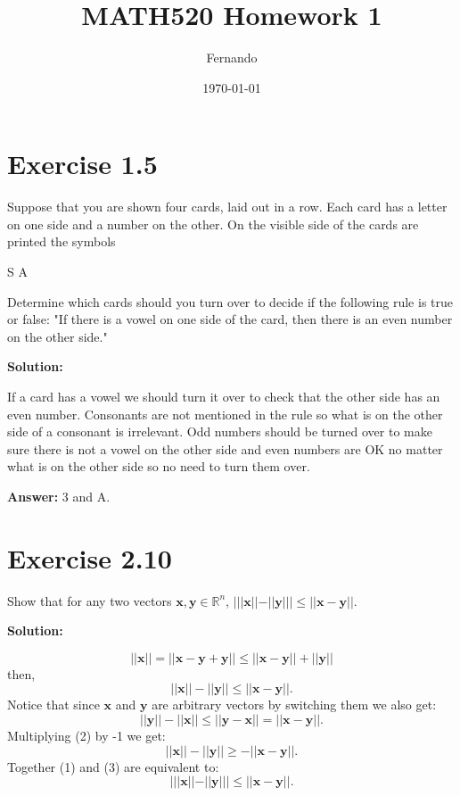 \documentclass{article}
\newcommand{\bld}[1]{\boldsymbol{#1}}
\begin{document}
\title{MATH520 Homework 1}
\author{Fernando}
\date{\today}
\maketitle

\section*{Exercise 1.5}
Suppose that you are shown four cards, laid out in a row. Each card has a letter on one side and a number on the other. On the visible side of the cards are printed the symbols

\begin{center}
S   \quad A
\end{center}

Determine which cards should you turn over to decide if the following rule is true or false: "If there is a vowel on one side of the card, then there is an even number on the other side."

\textbf{Solution:}

If a card has a vowel we should turn it over to check that the other side has
an even number. Consonants are not mentioned in the rule so what is on the
other side of a consonant is irrelevant. Odd numbers should be turned over to
make sure there is not a vowel on the other side and even numbers are OK no
matter what is on the other side so no need to turn them over.

\textbf{Answer:} 3 and A.
\section*{Exercise 2.10}
Show that for any two vectors $\boldsymbol{x},\boldsymbol{y}\in\mathbb{R}^n$,
$|||\boldsymbol{x}||-||\boldsymbol{y}||| \leq
||\boldsymbol{x}-\boldsymbol{y}||$.

\textbf{Solution:}

\[
||\bld{x}||=||\bld{x}-\bld{y}+\bld{y}|| \leq ||\bld{x}-\bld{y}|| + ||\bld{y}||
\]
then,
\begin{equation}
||\bld{x}||-||\bld{y}|| \leq ||\bld{x}-\bld{y}||.
\end{equation}
Notice that since $\bld{x}$ and  $\bld{y}$ are arbitrary vectors by switching
them we also get:
\begin{equation}
||\bld{y}||-||\bld{x}|| \leq ||\bld{y}-\bld{x}||=||\bld{x}-\bld{y}||.
\end{equation}
Multiplying (2) by -1 we get:
\begin{equation}
||\bld{x}||-||\bld{y}|| \geq -||\bld{x}-\bld{y}||.
\end{equation}
Together (1) and (3) are equivalent to:
\[
	|||\bld{x}||-||\bld{y}|||\leq ||\bld{x}-\bld{y}||.
\]
\end{document}
